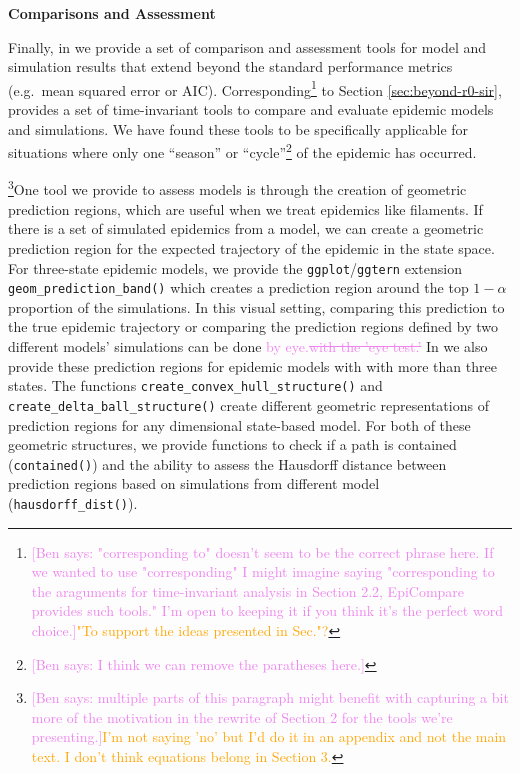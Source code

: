 \documentclass[
  shortnames]{jss}
\begin{document}
\textbf{Comparisons and Assessment}

Finally, in  we provide a set of comparison and
assessment tools for model and simulation results that extend beyond the
standard performance metrics (e.g.~mean squared error or AIC).
Corresponding\footnote{\textcolor{violet}{[Ben says: "corresponding to" doesn't seem to be the correct phrase here. If we wanted to use "corresponding" I might imagine saying "corresponding to the araguments for time-invariant analysis in Section 2.2, EpiCompare provides such tools." I'm open to keeping it if you think it's the perfect word choice.]}\textcolor{orange}{"To support the ideas presented in Sec."?}}
to Section \ref{sec:beyond-r0-sir},  provides a set of
time-invariant tools to compare and evaluate epidemic models and
simulations. We have found these tools to be specifically applicable for
situations where only one ``season'' or
``cycle''\footnote{\textcolor{violet}{[Ben says: I think we can remove the paratheses here.]}}
of the epidemic has occurred.

\footnote{\textcolor{violet}{[Ben says: multiple parts of this paragraph might benefit with capturing a bit more of the motivation in the rewrite of Section 2 for the tools we're presenting.]}\textcolor{orange}{I'm not saying 'no' but I'd do it in an appendix and not the main text.  I don't think equations belong in Section 3.}}One
tool we provide to assess models is through the creation of geometric
prediction regions, which are useful when we treat epidemics like
filaments. If there is a set of simulated epidemics from a model, we can
create a geometric prediction region for the expected trajectory of the
epidemic in the state space. For three-state epidemic models, we provide
the \texttt{ggplot}/\texttt{ggtern} extension
\texttt{geom\_prediction\_band()} which creates a prediction region
around the top \(1-\alpha\) proportion of the simulations. In this
visual setting, comparing this prediction to the true epidemic
trajectory or comparing the prediction regions defined by two different
models' simulations can be done
\textcolor{violet}{by eye.\sout{with the 'eye test.'}} In
 we also provide these prediction regions for epidemic
models with with more than three states. The functions
\texttt{create\_convex\_hull\_structure()} and
\texttt{create\_delta\_ball\_structure()} create different geometric
representations of prediction regions for any dimensional state-based
model. For both of these geometric structures, we provide functions to
check if a path is contained (\texttt{contained()}) and the ability to
assess the Hausdorff distance between prediction regions based on
simulations from different model (\texttt{hausdorff\_dist()}).
\end{document}
